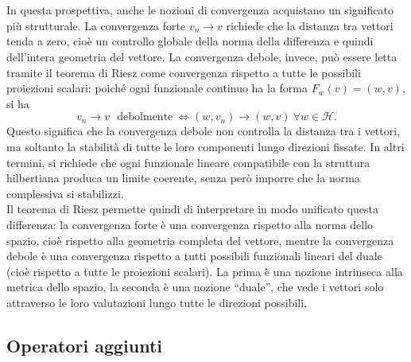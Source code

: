 \documentclass[a4paper,12pt]{report}
\begin{document}
\\
\\In questa prospettiva, anche le nozioni di convergenza acquistano un significato più strutturale. La convergenza forte $v_n \to v$ richiede che la distanza tra vettori tenda a zero, cioè un controllo globale della norma della differenza e quindi dell’intera geometria del vettore. La convergenza debole, invece, può essere letta tramite il teorema di Riesz come convergenza rispetto a tutte le possibili proiezioni scalari: poiché ogni funzionale continuo ha la forma $F_w(v)=(w,v)$, si ha
\[
v_n \to  v\ \ \  \text{debolmente}\ \iff  (w,v_n)\to (w,v)\ \forall w\in \mathscr{H}.
\]
Questo significa che la convergenza debole non controlla la distanza tra i vettori, ma soltanto la stabilità di tutte le loro componenti lungo direzioni fissate. In altri termini, si richiede che ogni funzionale lineare compatibile con la struttura hilbertiana produca un limite coerente, senza però imporre che la norma complessiva si stabilizzi.
\\Il teorema di Riesz permette quindi di interpretare in modo unificato questa differenza: la convergenza forte è una convergenza rispetto alla norma dello spazio, cioè rispetto alla geometria completa del vettore, mentre la convergenza debole è una convergenza rispetto a tutti possibili funzionali lineari del duale (cioè rispetto a tutte le proiezioni scalari). La prima è una nozione intrinseca alla metrica dello spazio, la seconda è una nozione “duale”, che vede i vettori solo attraverso le loro valutazioni lungo tutte le direzioni possibili.

\subsection{Operatori aggiunti}
\end{document}
